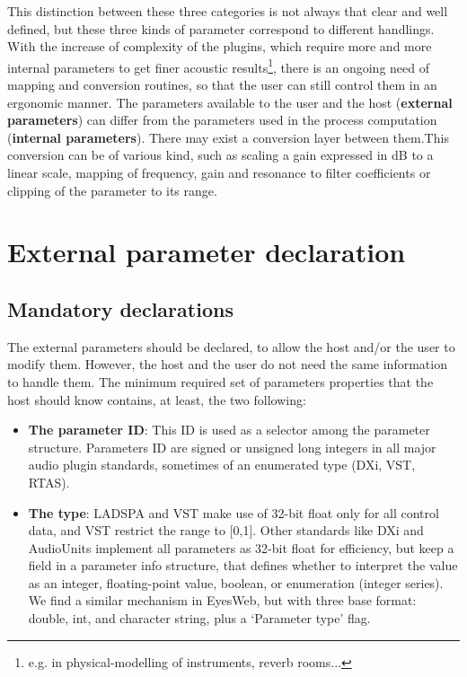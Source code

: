 \noindent This distinction between these three categories is not always that clear and well defined, but these three kinds of parameter correspond to different handlings.\\

\noindent With the increase of complexity of the plugins, which require more and more internal parameters to get finer acoustic results\footnote{e.g. in physical-modelling of instruments, reverb rooms...}, there is an ongoing need of mapping and conversion routines, so that the user can still control them in an ergonomic manner. The parameters available to the user and the host (\textbf{external parameters}) can differ from the parameters used in the process computation (\textbf{internal parameters}). There may exist a conversion layer between them.This conversion can be of various kind, such as scaling a gain expressed in dB to a linear scale, mapping of frequency, gain and resonance to filter coefficients or clipping of the parameter to its range.\\


\section{External parameter declaration}
\subsection{Mandatory declarations}
\noindent The external parameters should be declared, to allow the host and/or the user to modify them. However, the host and the user do not need the same information to handle them.
The minimum required set of parameters properties that the host should know contains, at least, the two following:
\begin{itemize}
\item{\textbf{The parameter ID}}: This ID is used as a selector among the parameter structure. Parameters ID are signed or unsigned long integers in all major audio plugin standards, sometimes of an enumerated type (DXi, VST, RTAS).

\item{\textbf{The type}}: LADSPA and VST make use of 32-bit float only for all control data, and VST restrict the range to [0,1]. Other standards like DXi and AudioUnits implement all parameters as 32-bit float for efficiency, but keep a field in a parameter info structure, that defines whether to interpret the value as an integer, floating-point value, boolean, or enumeration (integer series). We find a similar mechanism in EyesWeb, but with three base format: double, int, and character string, plus a `Parameter type' flag.\\
\end{itemize}


